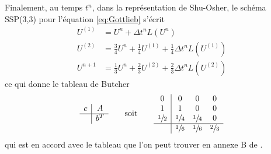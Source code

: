 \documentclass[11pt, a4paper, oneside]{report}
\begin{document}
Finalement, au temps $t^n$, dans la représentation de Shu-Osher, le schéma SSP(3,3) pour l'équation \eqref{eq:Gottlieb} s'écrit
\begin{equation}
    \begin{aligned}
        U^{(1)} & = U^n + \Delta t^n L \left( U^n \right) \\
        U^{(2)} & = \frac{3}{4} U^n + \frac{1}{4} U^{(1)} + \frac{1}{4} \Delta t^n L \left( U^{(1)} \right) \\
        U^{n+1} & = \frac{1}{3} U^n + \frac{2}{3} U^{(2)} + \frac{2}{3} \Delta t^n L \left( U^{(2)} \right)
    \end{aligned}
\end{equation}
ce qui donne le tableau de Butcher
\begin{equation} \label{eq:Butcher_SSP_33}
    \begin{array}{c|c}
        c & A \\
        \hline
        & b^T
    \end{array}
    \qquad \text{soit} \qquad
    \begin{array}{c|ccc}
    0 & 0 & 0 & 0 \\
    1 & 1 & 0 & 0 \\
    \sfrac{1}{2} & \sfrac{1}{4} & \sfrac{1}{4} & 0 \\
    \hline
    & \sfrac{1}{6} & \sfrac{1}{6} & \sfrac{2}{3}
    \end{array}
\end{equation}
qui est en accord avec le tableau que l'on peut trouver en annexe B de \cite{spiteri2002new}. \\
\end{document}
